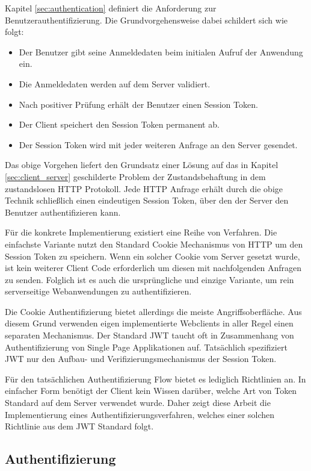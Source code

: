 Kapitel \ref{sec:authentication} definiert die Anforderung zur Benutzerauthentifizierung. Die Grundvorgehensweise dabei schildert sich wie folgt:

\begin{itemize}
  \item Der Benutzer gibt seine Anmeldedaten beim initialen Aufruf der Anwendung ein.
  \item Die Anmeldedaten werden auf dem Server validiert.
  \item Nach positiver Prüfung erhält der Benutzer einen Session Token.
  \item Der Client speichert den Session Token permanent ab.
  \item Der Session Token wird mit jeder weiteren Anfrage an den Server gesendet. 
\end{itemize}

Das obige Vorgehen liefert den Grundsatz einer Lösung auf das in Kapitel \ref{sec:client_server} geschilderte Problem der Zustandsbehaftung in dem zustandslosen HTTP Protokoll. Jede HTTP Anfrage erhält durch die obige Technik schließlich einen eindeutigen Session Token, über den der Server den Benutzer authentifizieren kann. 

Für die konkrete Implementierung existiert eine Reihe von Verfahren. Die einfachste Variante nutzt den Standard Cookie Mechanismus von HTTP um den Session Token zu speichern. Wenn ein solcher Cookie vom Server gesetzt wurde, ist kein weiterer Client Code erforderlich um diesen mit nachfolgenden Anfragen zu senden. Folglich ist es auch die ursprüngliche und einzige Variante, um rein serverseitige Webanwendungen zu authentifizieren.

Die Cookie Authentifizierung bietet allerdings die meiste Angriffsoberfläche. Aus diesem Grund verwenden eigen implementierte Webclients in aller Regel einen separaten Mechanismus. Der Standard JWT taucht oft in Zusammenhang von Authentifizierung von Single Page Applikationen auf.
Tatsächlich spezifiziert JWT nur den Aufbau- und Verifizierungsmechanismus der Session Token. 

Für den tatsächlichen Authentifizierung Flow bietet es lediglich Richtlinien an. In einfacher Form benötigt der Client kein Wissen darüber, welche Art von Token Standard auf dem Server verwendet wurde. Daher zeigt diese Arbeit die Implementierung eines Authentifizierungsverfahren, welches einer solchen Richtlinie aus dem JWT Standard folgt. 

\subsection{Authentifizierung}

